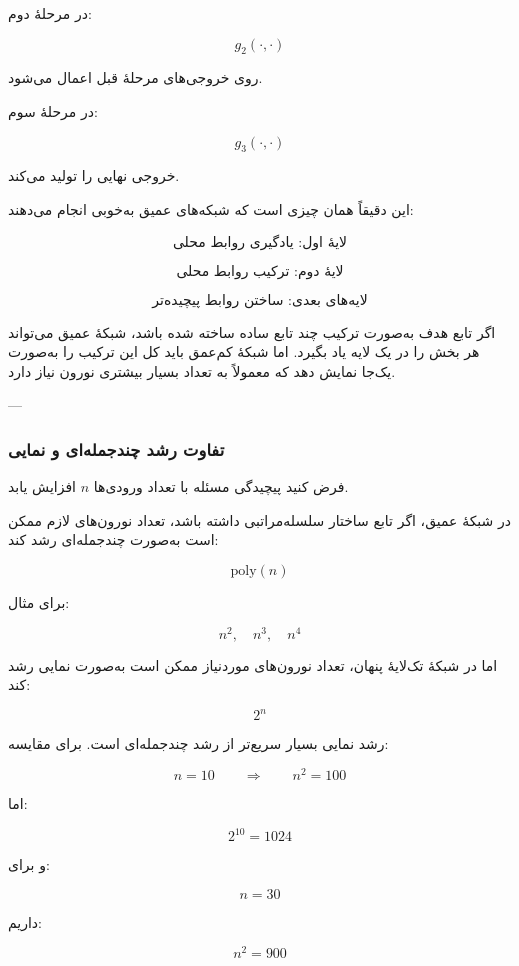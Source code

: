 \documentclass[12pt,a4paper]{article}
\begin{document}
در مرحلهٔ دوم:

\[
g_2(\cdot,\cdot)
\]

روی خروجی‌های مرحلهٔ قبل اعمال می‌شود.

در مرحلهٔ سوم:

\[
g_3(\cdot,\cdot)
\]

خروجی نهایی را تولید می‌کند.

این دقیقاً همان چیزی است که شبکه‌های عمیق به‌خوبی انجام می‌دهند:

\[
\text{لایهٔ اول: یادگیری روابط محلی}
\]

\[
\text{لایهٔ دوم: ترکیب روابط محلی}
\]

\[
\text{لایه‌های بعدی: ساختن روابط پیچیده‌تر}
\]

\begin{tcolorbox}[
	colback=softorange,
	colframe=golden,
	title=مثال ساده از مزیت عمق,
	coltitle=black
	]
	اگر تابع هدف به‌صورت ترکیب چند تابع ساده ساخته شده باشد، شبکهٔ عمیق می‌تواند هر بخش را در یک لایه یاد بگیرد. اما شبکهٔ کم‌عمق باید کل این ترکیب را به‌صورت یک‌جا نمایش دهد که معمولاً به تعداد بسیار بیشتری نورون نیاز دارد.
\end{tcolorbox}

---

\subsubsection{تفاوت رشد چندجمله‌ای و نمایی}

فرض کنید پیچیدگی مسئله با تعداد ورودی‌ها \(n\) افزایش یابد.

در شبکهٔ عمیق، اگر تابع ساختار سلسله‌مراتبی داشته باشد، تعداد نورون‌های لازم ممکن است به‌صورت چندجمله‌ای رشد کند:

\[
\mathrm{poly}(n)
\]

برای مثال:

\[
n^2,\quad n^3,\quad n^4
\]

اما در شبکهٔ تک‌لایهٔ پنهان، تعداد نورون‌های موردنیاز ممکن است به‌صورت نمایی رشد کند:

\[
2^n
\]

رشد نمایی بسیار سریع‌تر از رشد چندجمله‌ای است. برای مقایسه:

\[
n=10
\qquad\Longrightarrow\qquad
n^2=100
\]

اما:

\[
2^{10}=1024
\]

و برای:

\[
n=30
\]

داریم:

\[
n^2=900
\]
\end{document}
